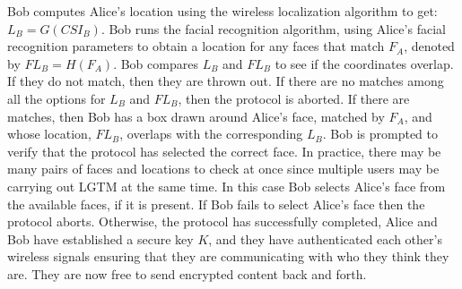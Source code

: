 \documentclass[12pt]{report}
\begin{document}
Bob computes Alice's location using the wireless localization algorithm to get: $L_{B} = G(CSI_{B})$. Bob runs the facial recognition algorithm, using Alice's facial recognition parameters to obtain a location for any faces that match $F_{A}$, denoted by $FL_{B} = H(F_{A})$. Bob compares $L_{B}$ and $FL_{B}$ to see if the coordinates overlap. If they do not match, then they are thrown out. If there are no matches among all the options for $L_{B}$ and $FL_{B}$, then the protocol is aborted. If there are matches, then Bob has a box drawn around Alice's face, matched by $F_{A}$, and whose location, $FL_{B}$, overlaps with the corresponding $L_{B}$. Bob is prompted to verify that the protocol has selected the correct face. In practice, there may be many pairs of faces and locations to check at once since multiple users may be carrying out LGTM at the same time. In this case Bob selects Alice's face from the available faces, if it is present. If Bob fails to select Alice's face then the protocol aborts. Otherwise, the protocol has successfully completed, Alice and Bob have established a secure key $K$, and they have authenticated each other's wireless signals ensuring that they are communicating with who they think they are. They are now free to send encrypted content back and forth. \par
\end{document}
